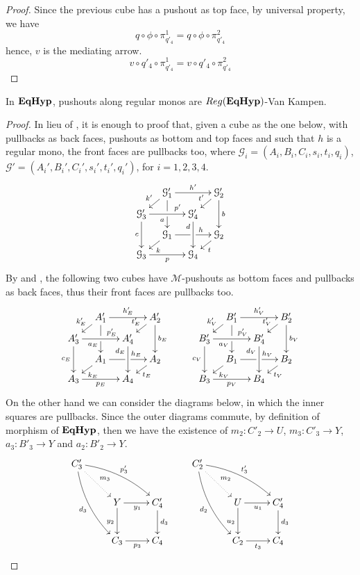\documentclass[a4paper,UKenglish,cleveref,pdftex,thm-restate,numberwithinsect]{lipics-v2021}
\def\B{\textbf {\textup{B}}}
\def\A{\textbf {\textup{A}}}
\newcommand{\catname}[1]{\textbf{\textup{#1}}}
\newcommand{\EqHyp}{\catname{EqHyp}} %
\newcommand{\reg}{\mathsf{Reg}}
\begin{document}
\begin{proof}
	Since the previous cube has a pushout as top face, by universal property, we have
	\[
	q \circ \phi \circ \pi_{q'_4}^1 = q \circ \phi \circ \pi_{q'_4}^2
	\]
	hence, $v$ is the mediating arrow.
	\[
	v \circ q'_4 \circ \pi_{q'_4}^1 = v \circ q'_4 \circ \pi_{q'_4}^2
	\]
	
	
\end{proof}

\begin{lemma}\label{lemma:van_kampen}
	In $\EqHyp$, pushouts along regular monos are $\reg(\EqHyp)$-Van Kampen.
\end{lemma}

\begin{proof}
	In lieu of , it is enough to proof that, given a cube as the one below, with pullbacks as back faces, pushouts as bottom and top faces and such that $h$ is a regular mono,
	the front faces are pullbacks too, where $\mathcal{G}_i = (A_i, B_i, C_i, s_i, t_i, q_i)$, $\mathcal{G}'=(A_i', B_i', C_i', s_i', t_i', q_i')$, for $i = 1, 2, 3, 4$.
	\[
	\xymatrix@C=10pt@R=6pt{&\mathcal{G}_1'\ar[dd]|\hole_(.65){a}\ar[rr]^{h'} \ar[dl]_{k'} && \mathcal{G}_2' \ar[dd]^{b} \ar[dl]_{t'} \\ \mathcal{G}_3'  \ar[dd]_{c}\ar[rr]^(.7){p'} & & \mathcal{G}_4' \ar[dd]_(.3){d}\\&\mathcal{G}_1\ar[rr]|\hole^(.65){h} \ar[dl]^{k} && \mathcal{G}_2 \ar[dl]^{t} \\\mathcal{G}_3 \ar[rr]_{p} & & \mathcal{G}_4 }
	\]
	By  and , the following two cubes have $\mathcal{M}$-pushouts as bottom faces and pullbacks as back faces,
	thus their front faces are pullbacks too.
	\[
	\xymatrix@C=10pt@R=6pt{&A_1'\ar[dd]|\hole_(.65){a_E}\ar[rr]^{h_E'} \ar[dl]_{k_E'} && A_2' \ar[dd]^{b_E} \ar[dl]_{t_E'} \\ A_3'  \ar[dd]_{c_E}\ar[rr]^(.7){p_E'} & & A_4' \ar[dd]_(.3){d_E}\\&A_1\ar[rr]|\hole^(.65){h_E} \ar[dl]^{k_E} && A_2 \ar[dl]^{t_E} \\A_3 \ar[rr]_{p_E} & & A_4 }
	\qquad
	\xymatrix@C=10pt@R=6pt{&B_1'\ar[dd]|\hole_(.65){a_V}\ar[rr]^{h_V'} \ar[dl]_{k_V'} && B_2' \ar[dd]^{b_V} \ar[dl]_{t_V'} \\ B_3'  \ar[dd]_{c_V}\ar[rr]^(.7){p_V'} & & B_4' \ar[dd]_(.3){d_V}\\&B_1\ar[rr]|\hole^(.65){h_V} \ar[dl]^{k_V} && B_2 \ar[dl]^{t_V} \\B_3 \ar[rr]_{p_V} & & B_4 }
	\]
	On the other hand we can consider the diagrams below, in which the inner squares are pullbacks.
	Since the outer diagrams commute, by definition of morphism of $\EqHyp$, then we have the existence of $m_2\colon C'_2\to U$, $m_3\colon C'_3\to Y $, $a_3\colon B'_3\to Y$ and $a_2\colon B'_2\to Y$.
	\[\xymatrix{C'_3 \ar@{.>}[dr]^{m_3} \ar@/^.3cm/[drr]^{p'_3} \ar@/_.3cm/[ddr]_{d_3} &&& C'_2 \ar@{.>}[dr]^{m_2} \ar@/^.3cm/[drr]^{t'_3} \ar@/_.3cm/[ddr]_{d_2}\\&Y \ar[r]_{y_1} \ar[d]_{y_2}& C'_4\ar[d]^{d_3}&& U \ar[d]_{u_2}\ar[r]_{u_1}& C'_4 \ar[d]^{d_3}\\&C_3 \ar[r]_{p_3}& C_4 &&C_2 \ar[r]_{t_3}& C_4 }\]
	

\end{proof}
\end{document}
